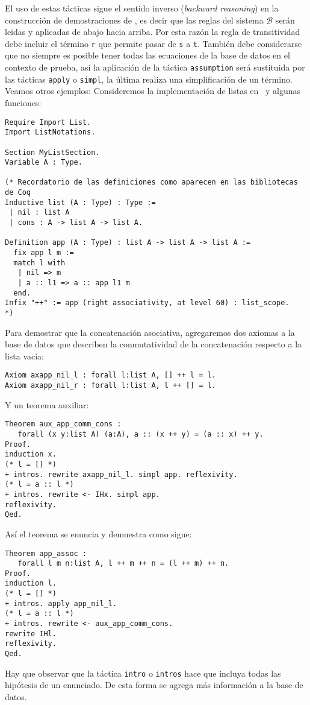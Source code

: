 \documentclass[11pt,letterpaper]{article}
\begin{document}
El uso de estas t\'acticas sigue el sentido inverso (\textit{backward 
reasoning}) en la construcci\'on de demostraciones de {\coq}, es decir que las 
reglas del sistema $\mathcal{B}$ ser\'an leidas y aplicadas de abajo hacia 
arriba.
Por esta raz\'on la regla de transitividad debe incluir el t\'ermino \verb-r- 
que permite pasar de \verb-s- a \verb-t-. 
Tambi\'en debe considerarse que no siempre es posible tener todas las 
ecuaciones de la base de datos en el contexto de prueba, as\'i la aplicaci\'on 
de la t\'actica \verb=assumption= ser\'a sustituida por las t\'acticas 
\verb=apply= o \verb=simpl=, la \'ultima realiza una simplificaci\'on de un 
t\'ermino. 
Veamos otros ejemplos:
Consideremos la implementaci\'on de listas en~{\coq} y algunas funciones:
\begin{lstlisting}
Require Import List.
Import ListNotations.

Section MyListSection.
Variable A : Type.

(* Recordatorio de las definiciones como aparecen en las bibliotecas de Coq
Inductive list (A : Type) : Type :=
 | nil : list A
 | cons : A -> list A -> list A.
 
Definition app (A : Type) : list A -> list A -> list A :=
  fix app l m :=
  match l with
   | nil => m
   | a :: l1 => a :: app l1 m
  end.
Infix "++" := app (right associativity, at level 60) : list_scope.
*)
\end{lstlisting}
Para demostrar que la concatenaci\'on asociativa, agregaremos dos axiomas a la 
base de datos que describen la conmutatividad de la concatenaci\'on respecto a 
la lista vac\'ia:
\begin{lstlisting}
Axiom axapp_nil_l : forall l:list A, [] ++ l = l.
Axiom axapp_nil_r : forall l:list A, l ++ [] = l.
\end{lstlisting}
Y un teorema auxiliar:
\begin{lstlisting}
Theorem aux_app_comm_cons : 
   forall (x y:list A) (a:A), a :: (x ++ y) = (a :: x) ++ y.
Proof.
induction x.
(* l = [] *)
+ intros. rewrite axapp_nil_l. simpl app. reflexivity.
(* l = a :: l *)
+ intros. rewrite <- IHx. simpl app.
reflexivity.
Qed.
\end{lstlisting}
As\'i el teorema se enuncia y demuestra como sigue:
\begin{lstlisting}
Theorem app_assoc : 
   forall l m n:list A, l ++ m ++ n = (l ++ m) ++ n.
Proof.
induction l.
(* l = [] *)
+ intros. apply app_nil_l.
(* l = a :: l *)
+ intros. rewrite <- aux_app_comm_cons. 
rewrite IHl. 
reflexivity.
Qed.
\end{lstlisting}
Hay que observar que la t\'actica \verb=intro= o \verb=intros= hace que {\coq} 
incluya todas las hip\'otesis de un enunciado. De esta forma se agrega m\'as 
informaci\'on a la base de datos.
\eeje
\end{document}
